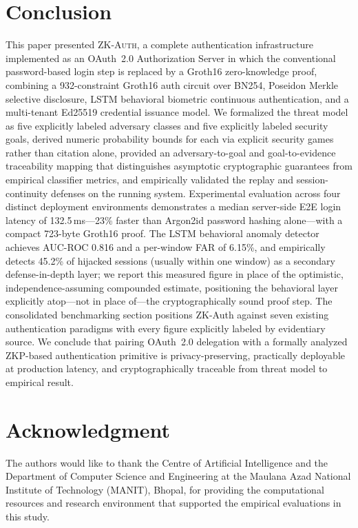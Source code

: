 \documentclass[journal,twoside,10pt]{IEEEtran}
\begin{document}
\section{Conclusion}
\label{sec:conclusion}
This paper presented \textsc{ZK-Auth}, a complete authentication
infrastructure implemented as an OAuth~2.0 Authorization Server in which
the conventional password-based login step is replaced by a Groth16
zero-knowledge proof, combining a 932-constraint Groth16 auth circuit over
BN254, Poseidon Merkle selective disclosure, LSTM behavioral biometric
continuous authentication, and a multi-tenant Ed25519 credential issuance
model. We formalized the threat model as five explicitly labeled adversary
classes and five explicitly labeled security goals, derived numeric
probability bounds for each via explicit security games rather than
citation alone, provided an adversary-to-goal and goal-to-evidence
traceability mapping that distinguishes asymptotic cryptographic
guarantees from empirical classifier metrics, and empirically validated
the replay and session-continuity defenses on the running system.
Experimental evaluation across four distinct deployment environments
demonstrates a median server-side E2E login latency of 132.5\,ms---23\%
faster than Argon2id password hashing alone---with a compact 723-byte
Groth16 proof. The LSTM behavioral anomaly detector achieves AUC-ROC 0.816
and a per-window FAR of 6.15\%, and empirically detects 45.2\% of hijacked
sessions (usually within one window) as a secondary defense-in-depth layer;
we report this measured figure in place of the optimistic,
independence-assuming compounded estimate, positioning the behavioral layer
explicitly atop---not in place of---the cryptographically sound proof step.
The consolidated benchmarking section positions ZK-Auth against seven existing
authentication paradigms with every figure explicitly labeled by
evidentiary source. We conclude that pairing OAuth~2.0 delegation with a
formally analyzed ZKP-based authentication primitive is privacy-preserving,
practically deployable at production latency, and cryptographically
traceable from threat model to empirical result.

\section*{Acknowledgment}
The authors would like to thank the Centre of Artificial Intelligence and the Department of Computer Science and Engineering at the Maulana Azad National Institute of Technology (MANIT), Bhopal, for providing the computational resources and research environment that supported the empirical evaluations in this study.
\end{document}
